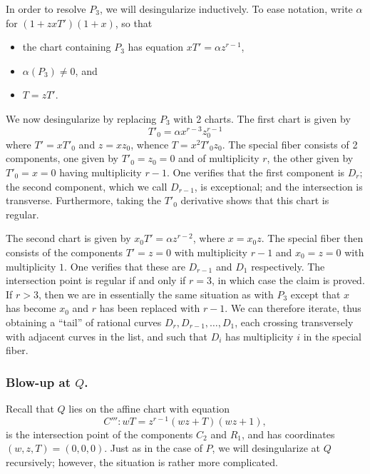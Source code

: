 \documentclass[pagesize,paper=letter]{scrartcl}
\theoremstyle{plain}
\theoremstyle{definition}
\theoremstyle{remark}
\begin{document}
In order to resolve $P_3$, we will desingularize inductively. To ease notation, write $\alpha$ for $(1 + zxT')(1 + x)$, so that
\begin{itemize}
    \item the chart containing $P_3$ has equation $xT' = \alpha z^{r-1}$,
    \item $\alpha(P_3) \neq 0$, and
    \item $T = zT'$.
\end{itemize}

We now desingularize by replacing $P_3$ with 2 charts. The first chart is given by
\[
T'_0 = \alpha x^{r-3} z_0^{r-1}
\]
where $T' = x T'_0$ and $z = x z_0$, whence $T = x^2 T'_0 z_0$. The special fiber consists of 2 components, one given by $T'_0 = z_0 = 0$ and of multiplicity $r$, the other given by $T'_0 = x = 0$ having multiplicity $r-1$. One verifies that the first component is $D_r$; the second component, which we call $D_{r-1}$, is exceptional; and the intersection is transverse. Furthermore, taking the $T'_0$ derivative shows that this chart is regular.

  The second chart is given by $x_0 T' = \alpha z^{r-2}$, where $x = x_0 z$. The special fiber then consists of the components $T' = z = 0$ with multiplicity $r-1$ and $x_0 = z = 0$ with multiplicity $1$. One verifies that these are $D_{r-1}$ and $D_1$ respectively. The intersection point is regular if and only if $r = 3$, in which case the claim is proved. If $r > 3$, then we are in essentially the same situation as with $P_3$ except that $x$ has become $x_0$ and $r$ has been replaced with $r-1$. We can therefore iterate, thus obtaining a ``tail'' of rational curves $D_r, D_{r-1}, \dots, D_1$, each crossing transversely with adjacent curves in the list, and such that $D_i$ has multiplicity $i$ in the special fiber.


\subsubsection{Blow-up at $Q$.}
\label{sec:blow-up-Q}

Recall that $Q$ lies on the affine chart with equation
\begin{equation}
  C''':wT = z^{r-1}(wz + T)(wz + 1)\label{eq:C'''},
\end{equation}
is the intersection point of the components $C_2$ and $R_1$, and has coordinates $(w,z,T) = (0,0,0)$. Just as in the case of $P$, we will desingularize at $Q$ recursively; however, the situation is rather more complicated.  
\end{document}
